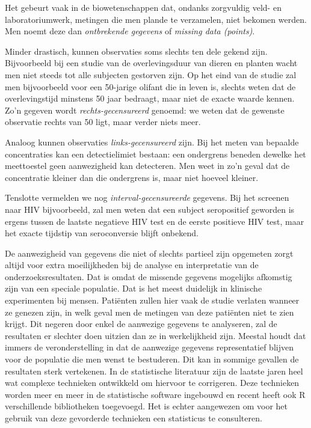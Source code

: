 \documentclass[
  12pt,dutch,coursenotes]{book}
\theoremstyle{definition}
\theoremstyle{definition}
\theoremstyle{definition}
\theoremstyle{remark}
\begin{document}
Het gebeurt vaak in de biowetenschappen dat, ondanks zorgvuldig veld- en laboratoriumwerk, metingen die men plande te verzamelen, niet bekomen werden. Men noemt deze dan \emph{ontbrekende gegevens} of \emph{missing data (points)}.

Minder drastisch, kunnen observaties soms slechts ten dele gekend zijn.
Bijvoorbeeld bij een studie van de overlevingsduur van dieren en planten wacht men niet steeds tot
alle subjecten gestorven zijn. Op het eind van de studie zal men bijvoorbeeld voor een 50-jarige
olifant die in leven is, slechts weten dat de overlevingstijd
minstens 50 jaar bedraagt, maar niet de exacte waarde kennen. Zo'n gegeven
wordt \emph{rechts-gecensureerd} genoemd: we weten dat de gewenste
observatie rechts van 50 ligt, maar verder niets meer.

Analoog kunnen observaties \emph{links-gecensureerd} zijn. Bij het meten
van bepaalde concentraties kan een detectielimiet bestaan: een ondergrens beneden
dewelke het meettoestel geen aanwezigheid kan detecteren. Men weet in zo'n
geval dat de concentratie kleiner dan die ondergrens is, maar niet hoeveel
kleiner.

Tenslotte vermelden we nog \emph{interval-gecensureerde} gegevens. Bij het
screenen naar HIV bijvoorbeeld, zal men weten dat een subject seropositief
geworden is ergens tussen de laatste negatieve HIV test en de eerste
positieve HIV test, maar het exacte tijdstip van seroconversie blijft
onbekend.

De aanwezigheid van gegevens die niet of slechts partieel zijn opgemeten zorgt
altijd voor extra moeilijkheden bij de analyse en interpretatie van de
onderzoeksresultaten. Dat is omdat de missende gegevens mogelijks afkomstig zijn
van een speciale populatie. Dat is het meest duidelijk in klinische experimenten bij mensen.
Patiënten zullen hier vaak de studie verlaten wanneer
ze genezen zijn, in welk geval men de metingen van deze patiënten niet te
zien krijgt. Dit negeren door enkel de aanwezige gegevens te analyseren, zal
de resultaten er slechter doen uitzien dan ze in werkelijkheid zijn. Meestal
houdt dat immers de veronderstelling in dat de aanwezige gegevens representatief blijven
voor de populatie die men wenst te bestuderen. Dit kan in sommige gevallen
de resultaten sterk vertekenen. In de statistische literatuur zijn de
laatste jaren heel wat complexe technieken ontwikkeld om hiervoor te
corrigeren. Deze technieken worden meer en meer in de statistische software
ingebouwd en recent heeft ook R verschillende bibliotheken toegevoegd.
Het is
echter aangewezen om voor het gebruik van deze gevorderde technieken een
statisticus te consulteren.
\end{document}
